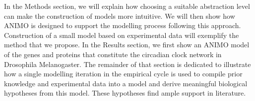 In the Methods section, we will explain how choosing a suitable abstraction level can make the construction
of models more intuitive. We will then show how ANIMO is designed to support the modelling process following
this approach. Construction of a small model based on experimental data will exemplify the method that we
propose. In the Results section, we first show an ANIMO model of the genes and proteins that constitute
the circadian clock network in Drosophila Melanogaster. The remainder of that section is dedicated to
illustrate how a single modelling iteration in the empirical cycle is used to compile prior knowledge and
experimental data into a model and derive meaningful biological hypotheses from this model. These hypotheses
find ample support in literature.
